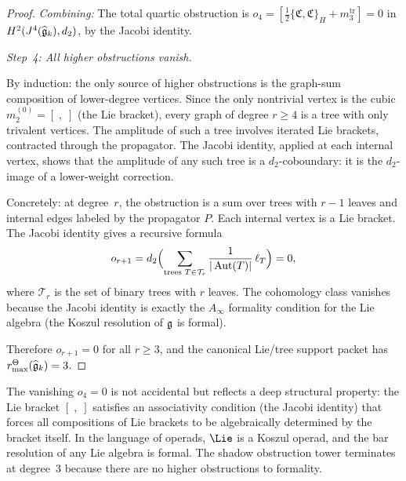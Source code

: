 \begin{proof}
\emph{Combining:}
The total quartic obstruction is
$o_4 = [\frac{1}{2}\{\mathfrak{C}, \mathfrak{C}\}_H
+ m_3^{\mathrm{tr}}] = 0$
in $H^2(J^4(\widehat{\mathfrak{g}}_k), d_2)$, by the Jacobi identity.

\medskip
\emph{Step~4: All higher obstructions vanish.}

By induction: the only source of higher obstructions is
the graph-sum composition of lower-degree vertices. Since
the only nontrivial vertex is the cubic
$m_2^{(0)} = [\;,\;]$ (the Lie bracket), every graph of
degree $r \geq 4$ is a tree with only trivalent vertices.
The amplitude of such a tree involves iterated Lie
brackets, contracted through the propagator. The Jacobi
identity, applied at each internal vertex, shows that
the amplitude of any such tree is a $d_2$-coboundary:
it is the $d_2$-image of a lower-weight correction.

Concretely: at degree~$r$, the obstruction is a sum over
trees with $r-1$ leaves and internal edges labeled by
the propagator $P$. Each internal vertex is a Lie
bracket. The Jacobi identity gives a recursive formula
\begin{equation}%
o_{r+1} = d_2\Bigl(
\sum_{\text{trees } T \in \mathcal{T}_{r}}
\frac{1}{|\Aut(T)|}\,\ell_T
\Bigr) = 0,
\end{equation}
where $\mathcal{T}_r$ is the set of binary trees with
$r$ leaves. The cohomology class vanishes because the
Jacobi identity is exactly the $A_\infty$ formality
condition for the Lie algebra (the Koszul resolution of
$\mathfrak{g}$ is formal).

Therefore $o_{r+1} = 0$ for all $r \geq 3$, and
the canonical Lie/tree support packet has
\(r^\Theta_{\max}(\widehat{\mathfrak{g}}_k) = 3\).
\end{proof}

\begin{remark}
The vanishing $o_4 = 0$ is not accidental but reflects
a deep structural property: the Lie bracket $[\;,\;]$
satisfies an associativity condition (the Jacobi identity)
that forces all compositions of Lie brackets to be
algebraically determined by the bracket itself. In the
language of operads, $\Lie$ is a Koszul operad, and
the bar resolution of any Lie algebra is formal. The
shadow obstruction tower terminates at degree~$3$ because there are
no higher obstructions to formality.
\end{remark}

